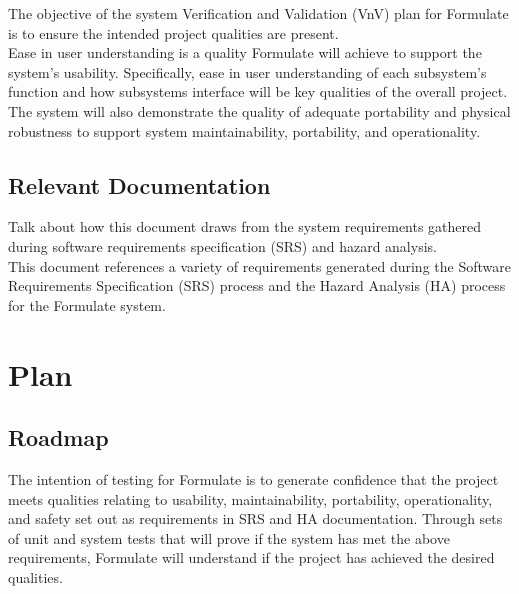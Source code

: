 \documentclass[12pt, titlepage]{article}
\begin{document}
  The objective of the system Verification and Validation (VnV) plan for Formulate is to ensure the intended project qualities are present.\\

  Ease in user understanding is a quality Formulate will achieve to support the system's usability.  Specifically, ease in user understanding of each subsystem's function and how subsystems interface will be key qualities of the overall project.\\

  The system will also demonstrate the quality of adequate portability and physical robustness to support system maintainability, portability, and operationality.\\



\subsection{Relevant Documentation}


  Talk about how this document draws from the system requirements gathered during software requirements specification (SRS) and hazard analysis.\\

  This document references a variety of requirements generated during the Software Requirements Specification (SRS) process and the Hazard Analysis (HA) process for the Formulate system. \\


\citet{SRS}
\newpage
\section{Plan}

  
  \subsection{Roadmap}

  The intention of testing for Formulate is to generate confidence that the project meets qualities relating to usability, maintainability, portability, operationality, and safety set out as requirements in SRS and HA documentation. Through sets of unit and system tests that will prove if the system has met the above requirements, Formulate will understand if the project has achieved the desired qualities.\\
\end{document}
